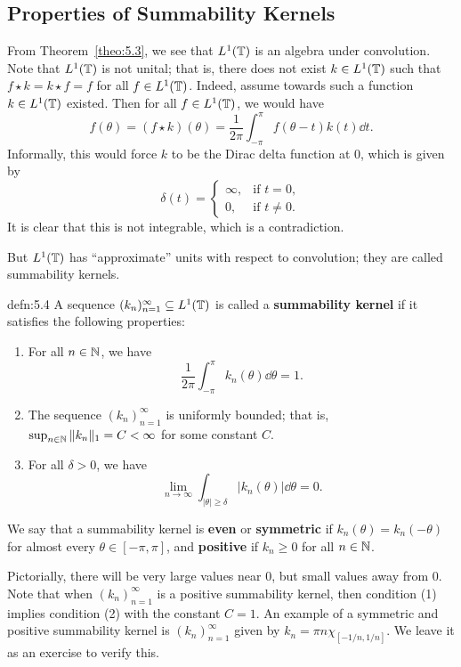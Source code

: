 \subsection{Properties of Summability Kernels} \label{subsec:5.2}
From Theorem~\ref{theo:5.3}, we see that $L^1(\mathbb{T})$ is an algebra under convolution. 
Note that $L^1(\mathbb{T})$ is not unital; that is, there does not exist $k \in L^1(\mathbb{T})$ 
such that $f \star k = k \star f = f$ for all $f \in L^1(\mathbb{T})$. Indeed, assume 
towards such a function $k \in L^1(\mathbb{T})$ existed. Then for all $f \in L^1(\mathbb{T})$, 
we would have 
\[ f(\theta) = (f \star k)(\theta) = \frac{1}{2\pi} \int_{-\pi}^\pi f(\theta - t)
k(t)\dd t. \] 
Informally, this would force $k$ to be the Dirac delta function at $0$, 
which is given by 
\[ \delta(t) = \begin{cases}
    \infty, & \text{if } t = 0, \\ 
    0, & \text{if } t \neq 0.
\end{cases} \] 
It is clear that this is not integrable, which is a contradiction.

But $L^1(\mathbb{T})$ has ``approximate'' units with respect to convolution; they are 
called summability kernels. 

\begin{defn}{defn:5.4}
    A sequence $(k_n)_{n=1}^\infty \subseteq L^1(\mathbb{T})$ is called a {\bf summability
    kernel} if it satisfies the following properties: 
    \begin{enumerate}[(1)]
        \item For all $n \in \mathbb{N}$, we have 
        \[ \frac{1}{2\pi} \int_{-\pi}^\pi k_n(\theta)\dd\theta = 1. \] 
        \item The sequence $(k_n)_{n=1}^\infty$ is uniformly bounded; that is, 
        $\sup_{n\in\mathbb{N}} \|k_n\|_1 = C < \infty$ for some constant $C$. 
        \item For all $\delta > 0$, we have 
        \[ \lim_{n\to\infty} \int_{|\theta|\geq\delta} |k_n(\theta)|\dd\theta = 0. \]
    \end{enumerate}
    We say that a summability kernel is {\bf even} or {\bf symmetric} if $k_n(\theta) 
    = k_n(-\theta)$ for almost every $\theta \in [-\pi, \pi]$, and {\bf positive} 
    if $k_n \geq 0$ for all $n \in \mathbb{N}$. 
\end{defn}

Pictorially, there will be very large values near $0$, but small values away from $0$. 
Note that when $(k_n)_{n=1}^\infty$ is a positive summability kernel, then 
condition (1) implies condition (2) with the constant $C = 1$. 
An example of a symmetric and positive summability kernel is $(k_n)_{n=1}^\infty$ given by 
$k_n = \pi n\chi_{[-1/n, 1/n]}$. We leave it as an exercise to verify this. 

